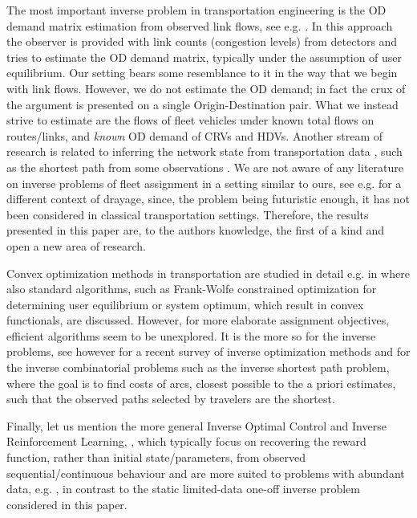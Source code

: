 \documentclass[a4paper,11pt]{article}
\begin{document}
The most important inverse problem in transportation engineering is the OD demand matrix estimation from observed link flows, see e.g. \cite{Bierlaire, Cascetta, Krylatov, VanZulyen}. In this approach the observer is provided with link counts (congestion levels) from detectors and tries to estimate the OD demand matrix, typically under the assumption of user equilibrium. Our setting bears some resemblance to it in the way that we begin with link flows. However, we do not estimate the OD demand; in fact the crux of the argument is presented on a single Origin-Destination pair. What we instead strive to estimate are the flows of fleet vehicles under known total flows on routes/links, and \emph {known} OD demand of CRVs and HDVs. Another stream of research is related to inferring the network state from transportation data \cite{NetworkLearning}, such as the shortest path from some observations \cite{BurtonToint}. 
We are not aware of any literature on inverse problems of fleet assignment in a setting similar to ours, see e.g. \cite{Drayage} for a different context of drayage, since, the problem being futuristic enough, it has not been considered in classical transportation settings. Therefore, the results presented in this paper are, to the authors knowledge, the first of a kind and open a new area of research. 

Convex optimization methods in transportation are studied in detail e.g. in \cite{BoylesBook} where also standard algorithms, such as Frank-Wolfe constrained optimization \cite{FrankWolfe} for determining user equilibrium or system optimum, which result in convex functionals, are discussed. However, for more elaborate assignment objectives,  efficient algorithms seem to be unexplored. It is the more so for the inverse problems, see however \cite{InverseOpt} for a recent survey of inverse optimization methods and \cite{Heuberger} for the inverse combinatorial problems such as the inverse shortest path problem, where the goal is to find costs of arcs, closest possible to the a priori estimates, such that the observed paths selected by travelers are the shortest.


Finally, let us mention the more general Inverse Optimal Control \cite{Kalman} and Inverse Reinforcement Learning, \cite{IOCIRL, Deshpande, IRL}, which typically focus on recovering the reward function, rather than initial state/parameters, from observed sequential/continuous behaviour and are more suited to problems with abundant data, e.g. \cite{ScalableIRL}, in contrast to the static limited-data one-off inverse problem considered in this paper. 
\end{document}
